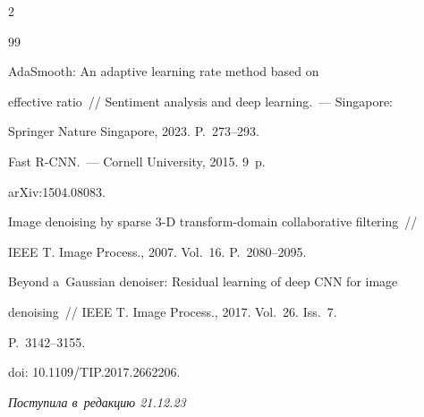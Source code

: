 \begin{multicols}{2}
{{\begin{thebibliography}{99}
    




     AdaSmooth: An adaptive learning rate method based on 


effective    ratio~// Sentiment analysis and deep learning.~--- Singapore: 


Springer Nature Singapore,   2023. P.~273--293.


    




     Fast {R-CNN}.~--- Cornell University, 2015. 9~p.


arXiv:1504.08083. 


    






    Image denoising by sparse 3-D transform-domain collaborative filtering~// 


IEEE T.  Image Process., 2007. Vol.~16. P.~2080--2095.


    






    Beyond a~Gaussian denoiser: Residual learning of deep CNN for image 


denoising~// IEEE T. Image Process., 2017. Vol.~26. Iss.~7. 


P.~3142--3155.


    doi: 10.1109/TIP.2017.2662206.


\end{thebibliography}





 }


 }





\end{multicols}





\vspace*{-6pt}





\hfill{\small\textit{Поступила в~редакцию 21.12.23}}





